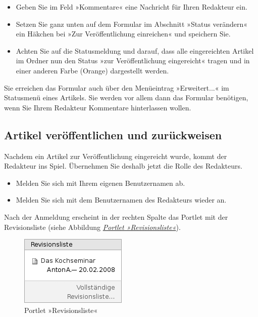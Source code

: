 \documentclass[a4paper,12pt,ngerman]{manual}
\begin{document}
\begin{itemize}
\item {} 
Geben Sie im Feld »Kommentare« eine Nachricht für Ihren Redakteur ein.

\item {} 
Setzen Sie ganz unten auf dem Formular im Abschnitt »Status verändern«
ein Häkchen bei »Zur Veröffentlichung einreichen« und speichern Sie.

\item {} 
Achten Sie auf die Statusmeldung und darauf, dass alle eingereichten
Artikel im Ordner nun den Status »zur Veröffentlichung eingereicht« tragen
und in einer anderen Farbe (Orange) dargestellt werden.

\end{itemize}

Sie erreichen das Formular auch über den Menüeintrag »Erweitert...« im
Statusmenü eines Artikels. Sie werden vor allem dann das Formular benötigen,
wenn Sie Ihrem Redakteur Kommentare hinterlassen wollen.
\hypertarget{sec-artik-redig-und}{}

\subsection{Artikel veröffentlichen und zurückweisen}

Nachdem ein Artikel zur Veröffentlichung eingereicht wurde, kommt der
Redakteur ins Spiel. Übernehmen Sie deshalb jetzt  die Rolle des Redakteurs.
\begin{itemize}
\item {} 
Melden Sie sich mit Ihrem eigenen Benutzernamen ab.

\item {} 
Melden Sie sich mit dem Benutzernamen des Redakteurs wieder an.

\end{itemize}

Nach der Anmeldung erscheint in der rechten Spalte das Portlet mit der
Revisionsliste (siehe Abbildung \hyperlink{fig-revisionsliste}{\emph{Portlet »Revisionsliste«}}).
\hypertarget{fig-revisionsliste}{}\begin{figure}[htbp]
\centering

\includegraphics{revisionsliste.png}
\caption{Portlet »Revisionsliste«}\end{figure}
\end{document}

